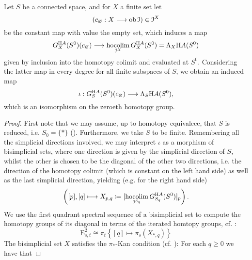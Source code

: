   \begin{lem}\label{lem_pi_0_loday_HA_A}
    Let $S$ be a connected space, and for $X$ a finite set let
    \begin{displaymath}
      (c_\varnothing: X \longrightarrow \operatorname{ob} \mathcal{I}) \in \mathcal{I}^X
    \end{displaymath}
    be the constant map with value the empty set, which induces a map
    \begin{displaymath}
      G_X^{\H A}(S^0)(c_\varnothing) \to \hocolim_{\cI^X} G_X^{\H A}(S^0) = %
      \Lambda_X \H A (S^0)
    \end{displaymath}
    given by inclusion into the homotopy colimit and evaluated at $S^0$.
    Considering the latter map in every degree for all finite subspaces of $S$,
    we obtain an induced map
    \begin{displaymath}
      \iota: G^{\mathrm{H} A}_S (S^0) (c_\varnothing) \longrightarrow \Lambda_S \mathrm{H} A (S^0), 
    \end{displaymath}
    which is an isomorphism on the zeroeth homotopy group.
    \begin{proof}
      First note that we may assume, up to homotopy equivalece, that $S$ is
      reduced, i.e. $S_0 = \{\ast\}$ (). Furthermore, we
      take $S$ to be finite. Remembering all the simplicial directions involved,
      we may interpret $\iota$ as a morphism of bisimplicial sets, where one
      direction is given by the simplicial direction of $S$, whilst the other is
      chosen to be the diagonal of the other two directions, i.e. the direction
      of the homotopy colimit (which is constant on the left hand side) as well
      as the last simplicial direction, yielding (e.g. for the right hand side)
      \begin{displaymath}
        \left( [p],[q] \longmapsto X_{p,q} \defas [\hocolim_{\cI^{S_q}} %
          G^{\H A}_{S_q} (S^0)]_p \right) . 
      \end{displaymath}
      We use the first quadrant spectral sequence of a bisimplicial set to compute
        the homotopy groups of its diagonal in terms of the iterated homtopy
        groups, cf. \cite[Thm. B5]{bousfield1978homotopy}:
        \begin{displaymath}
          \mathrm{E}^2_{s,t} %
            \cong \pi_t \left\{ [q] \mapsto \pi_s(X_{\ast,q}) \right\}	
        \end{displaymath}
      The bisimplicial set $X$ satisfies the $\pi_*$-Kan condition (cf.
      \cite[B.3.1]{bousfield1978homotopy}): For each $q \geq 0$ we have that

\end{proof}
\end{lem}
